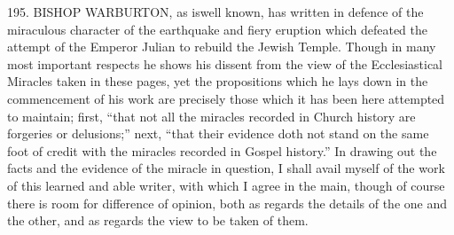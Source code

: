 
195.
BISHOP WARBURTON,
as is\emph{}well known, has
written in defence of the miraculous character of the earthquake and
fiery eruption which defeated the attempt of the Emperor Julian to
rebuild the Jewish Temple. Though in many most important respects he
shows his dissent from the view of the Ecclesiastical Miracles taken
in these pages, yet the propositions which he lays down in the
commencement of his work are precisely those which it has been here
attempted to maintain; first, ``that not all the miracles recorded
in Church history are forgeries or delusions;'' next, ``that their
evidence doth not stand on the same foot of credit with the miracles
recorded in Gospel history.'' In drawing out the facts and the
evidence of the miracle in question, I shall avail myself of the work
of this learned and able writer, with which I agree in the main,
though of course there is room for difference of opinion, both as
regards the details of the one and the other, and as regards the view
to be taken of them.

